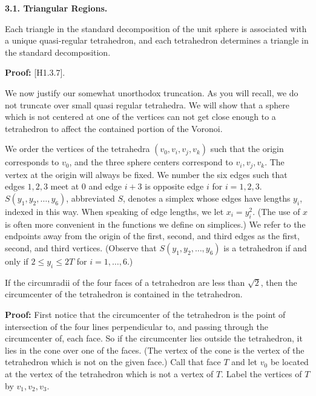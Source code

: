 \bigskip

{\bf 3.1. Triangular Regions.}

\bigskip

 Each triangle in the standard decomposition of 
the unit sphere is associated with a unique quasi-regular tetrahedron, 
and each tetrahedron determines a triangle in the standard decomposition.  
\endproclaim


{\bf Proof:} [H1.3.7].


\bigskip



We now justify our somewhat unorthodox truncation.  As you will recall, we 
do not truncate over small quasi regular tetrahedra.
We will show that a sphere which is not centered at one of the vertices 
can not get close enough to a tetrahedron to 
affect the contained portion of the Voronoi.  


We order the vertices of the tetrahedra $(v_0,v_i,v_j,v_k)$ such that the 
origin corresponds to $v_0$, and the three sphere centers correspond to 
$v_i,v_j,v_k$.  The vertex at the origin will always be fixed.  We number 
the six edges such that edges $1,2,3$ meet at $0$ and edge $i+3$ is
 opposite edge $i$ for $i=1,2,3$. $S(y_1,y_2,\dots,y_6)$, abbreviated $S$,
 denotes a simplex whose edges have lengths $y_i$, indexed in this way. 
When speaking of edge lengths, we let $x_i=y_i^2$.  (The use of $x$ is 
often more convenient in the functions we define on simplices.)
 We refer to the endpoints away from the origin of the first, second, 
and third edges as the first, second, and third vertices.
 (Observe that $S(y_1,y_2,\dots,y_6)$ is a tetrahedron if and only if
$2\le y_i \le 2T$ for $i=1,\ldots,6$.)


 If the circumradii of the four faces of a 
tetrahedron are less than $\sqrt 2$,
 then the circumcenter of the tetrahedron is contained in the tetrahedron. 
\endproclaim

{\bf Proof:}  First notice that the circumcenter of the tetrahedron is
 the point of intersection of the four lines perpendicular to, and passing
 through the circumcenter of, each face.  So if the 
circumcenter lies outside the tetrahedron, it lies in the cone over
one of the faces.  (The vertex of the cone is the vertex of the tetrahedron which is not on the given face.)
   Call that face $T$ and let $v_0$ be located at the vertex of the
 tetrahedron which is not a vertex of $T$.  Label the vertices of $T$ 
by $v_1,v_2,v_3$.  

